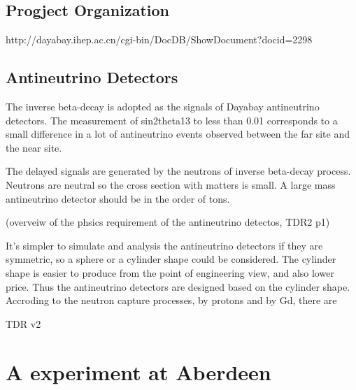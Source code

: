 \subsection{Progject Organization}

http://dayabay.ihep.ac.cn/cgi-bin/DocDB/ShowDocument?docid=2298

\subsection{Antineutrino Detectors}

The inverse beta-decay is adopted as the signals of Dayabay antineutrino detectors.
The measurement of sin2theta13 to less than 0.01 corresponds to a small
difference in a lot of antineutrino events observed between the far site and
the near site.

The delayed signals are generated by the neutrons of inverse beta-decay process.
Neutrons are neutral so the cross section with matters is small.
A large mass antineutrino detector should be in the order of tons.



(overveiw of the phsics requirement of the antineutrino detectos, TDR2 p1)

It's simpler to simulate and analysis the antineutrino detectors if they are
symmetric, so a sphere or a cylinder shape could be considered. The cylinder
shape is easier to produce from the point of engineering view, and also lower
price. Thus the antineutrino detectors are designed based on the cylinder shape.
Accroding to the neutron capture processes, by protons and by Gd, there are






TDR v2

\section{A experiment at Aberdeen}
